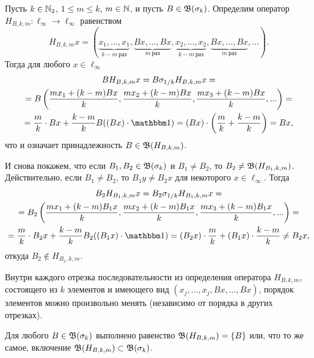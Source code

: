 \begin{example}
	Пусть $k\in \mathbb{N}_2$, $1 \leq m \leq k$, $m\in\mathbb{N}$, и пусть $B \in \mathfrak{B}(\sigma_k)$.
	Определим оператор $H_{B,k,m}:\ell_\infty \to \ell_\infty$ равенством
	\begin{equation}
		H_{B,k,m} x = (
			\underbrace{x_1, ..., x_1}_{k-m~\mbox{раз}}, \underbrace{Bx, ..., Bx}_{m~\mbox{раз}},
			\underbrace{x_2, ..., x_2}_{k-m~\mbox{раз}}, \underbrace{Bx, ..., Bx}_{m~\mbox{раз}},
			...)
		.
	\end{equation}
	Тогда для любого $x\in\ell_\infty$
	\begin{multline}
		B H_{B,k,m} x =
		B \sigma_{1/k} H_{B,k,m} x =
		\\=
		B\left(\dfrac{mx_1 + (k-m) Bx}{k}, \dfrac{mx_2 + (k-m) Bx}{k}, \dfrac{mx_3 + (k-m) Bx}{k}, ...\right)=
		\\=
		\dfrac{m}{k} \cdot Bx + \dfrac{k-m}{k} B ( (Bx)\cdot \one) =
		(Bx) \cdot \left(\dfrac m k + \dfrac{k-m}k \right) = Bx
		,
	\end{multline}
	что и означает принадлежность $B\in\mathfrak{B}(H_{B,k,m})$.

	И снова покажем, что если $B_1, B_2 \in \mathfrak{B}(\sigma_k)$ и $B_1 \ne B_2$, то $B_2 \ne \mathfrak{B} (H_{B_1,k,m})$.
	Действительно, если $B_1 \ne B_2$, то $B_1y \ne B_2x$ для некоторого $x\in\ell_\infty$.
	Тогда
	\begin{multline}
		B_2 H_{B_1,k,m} x =
		B_2 \sigma_{1/k} H_{B_1,k,m} x =
		\\=
		B_2\left(\dfrac{mx_1 + (k-m) B_1x}{k}, \dfrac{mx_2 + (k-m) B_1x}{k}, \dfrac{mx_3 + (k-m) B_1x}{k}, ...\right)=
		\\=
		\dfrac{m}{k} \cdot B_2x + \dfrac{k-m}{k} B_2 ( (B_1x)\cdot \one) =
		(B_2x) \cdot \dfrac m k + (B_1x)\cdot \dfrac{k-m}k \ne B_2x
		,
	\end{multline}
	откуда $B_2\notin H_{B_1,k,m}$.
\end{example}

\begin{remark}
	Внутри каждого отрезка последовательности из определения оператора $H_{B,k,m}$,
	состоящего из $k$ элементов и имеющего вид $(x_j, ..., x_j, Bx, ..., Bx)$,
	порядок элементов можно произвольно менять (независимо от порядка в других отрезках).
\end{remark}

\begin{hypothesis}
	Для любого $B\in\mathfrak{B}(\sigma_k)$ выполнено равенство $\mathfrak{B}(H_{B,k,m}) = \{B\}$ или, что то же самое,
	включение $\mathfrak{B}(H_{B,k,m}) \subset \mathfrak{B}(\sigma_k)$.
\end{hypothesis}

